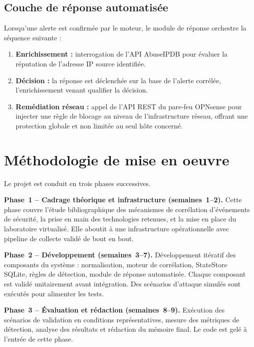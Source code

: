 \documentclass[a4paper,12pt]{article}
\begin{document}
\subsection*{Couche de réponse automatisée}

Lorsqu'une alerte est confirmée par le moteur, le module de réponse
orchestre la séquence suivante :

\begin{enumerate}
    \item \textbf{Enrichissement :} interrogation de l'API AbuseIPDB pour
    évaluer la réputation de l'adresse IP source identifiée.
    \item \textbf{Décision :} la réponse est déclenchée sur la base de
    l'alerte corrélée, l'enrichissement venant qualifier la décision.
    \item \textbf{Remédiation réseau :} appel de l'API REST du pare-feu
    OPNsense pour injecter une règle de blocage au niveau de
    l'infrastructure réseau, offrant une protection globale et non
    limitée au seul hôte concerné.
\end{enumerate}

\section{Méthodologie de mise en oeuvre}

Le projet est conduit en trois phases successives.

\medskip
\textbf{Phase~1 -- Cadrage théorique et infrastructure (semaines~1--2).}
Cette phase couvre l'étude bibliographique des mécanismes de corrélation
d'événements de sécurité, la prise en main des technologies retenues, et
la mise en place du laboratoire virtualisé. Elle aboutit à une
infrastructure opérationnelle avec pipeline de collecte validé de bout
en bout.

\medskip
\textbf{Phase~2 -- Développement (semaines~3--7).}
Développement itératif des composants du système : normalisation,
moteur de corrélation, StateStore SQLite, règles de détection, module
de réponse automatisée. Chaque composant est validé unitairement avant
intégration. Des scénarios d'attaque simulés sont exécutés pour
alimenter les tests.

\medskip
\textbf{Phase~3 -- Évaluation et rédaction (semaines~8--9).}
Exécution des scénarios de validation en conditions représentatives,
mesure des métriques de détection, analyse des résultats et rédaction
du mémoire final. Le code est gelé à l'entrée de cette phase.
\end{document}

